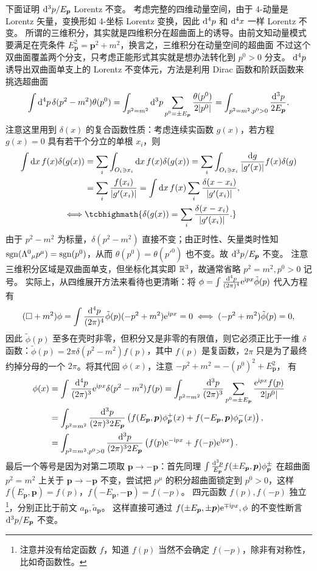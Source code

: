 下面证明 ${\dd[3]p}/{E_{\bm p}}$ Lorentz 不变。
考虑完整的四维动量空间，由于 4-动量是 Lorentz 矢量，变换形如 4-坐标 Lorentz 变换，因此 $\dd[4]{p}$ 和 $\dd[4]x$ 一样 Lorentz 不变。
所谓的三维积分，其实就是四维积分在超曲面上的诱导。由前文知动量模式要满足在壳条件 $E_{\bm p}^2=\bm p^2+m^2$，换言之，三维积分在动量空间的超曲面
不过这个双曲面覆盖两个分支，只考虑正能形式其实就是想办法转化到 $p^0>0$ 分支。
$\dd[4]{p}$ 诱导出双曲面单支上的 Lorentz 不变体元，方法是利用 Dirac 函数和阶跃函数来挑选超曲面
\[
    \int\dd[4]{p}\delta(p^2-m^2)\theta(p^0)= \int_{p^2=m^2}\dd[3]{p} \sum_{p^0=\pm E_{\bm p}}\frac{\theta(p^0)}{2| p^0|}=\int_{p^2=m^2,p^0>0}\frac{\dd[3]p}{2E_{\bm p}}.
\]
注意这里用到 $\delta(x)$ 的复合函数性质：考虑连续实函数 $g(x)$，若方程 $g(x) = 0$ 具有若干个分立的单根 $x_i$，则
\begin{align*}
    \int\d{x}f(x)\delta(g(x))&=\sum_i\int_{O_i\ni x_i}\d{x}f(x)\delta(g(x))=\sum_i\int_{O_i\ni x_i}\frac{\d{g}}{|g'(x)|}f(x)\delta(g)\\
    &=\sum_i\frac{f(x_i)}{|g'(x_i)|} = \int\d{x} f(x)\sum_i\frac{\delta(x-x_i)}{|g'(x_i)|},\\
    \iff& \tcbhighmath{\delta(g(x))=\sum_i \frac{\delta(x-x_i)}{|g'(x_i)|}.}
\end{align*}
由于 $p^2-m^2$ 为标量，$\delta(p^2-m^2)$ 直接不变；由正时性、矢量类时性知 $\operatorname{sgn}(\Lambda^0{}_\mu p^\mu)=\operatorname{sgn}(p^0)$，从而 $\theta(p^0)=\theta(p'^0)$ 也不变。故 ${\dd[3]p}/{E_{\bm p}}$ 不变。
注意三维积分区域是双曲面单支，但坐标化其实即 $\mathbb{R}^3$，故通常省略 $p^2=m^2,p^0>0$ 记号。
实际上，从四维展开方法来看待也更清晰：将 $\phi=\int\frac{\dd[4]{p}}{(2\pi)^4}\mathrm{e}^{\mathrm{i} px}\tilde\phi(p)$ 代入方程有
\[(\square + m^2)\phi = \int\frac{\dd[4]{p}}{(2\pi)^4}\tilde\phi(p)(-p^2 + m^2)\mathrm{e}^{\mathrm{i} px}=0\iff (-p^2+m^2)\tilde\phi(p)=0,\]
因此 $\tilde{\phi}(p)$ 至多在壳时非零，但积分又是非零的有限值，则它必须正比于一维 $\delta$ 函数：$\tilde{\phi}(p) = 2\pi \delta(p^2 - m^2) f(p)$，其中 $f(p)$ 是复函数，$2\pi$ 只是为了最终约掉分母的一个 $2\pi$。将其代回 $\phi(x)$，注意 $-p^2+m^2=-(p^0)^2 + E_{\bm p}^2$，
有
\begin{align*}
    \phi(x)&=\int\frac{\dd[4]{p}}{(2\pi)^3}\mathrm{e}^{\mathrm{i} px} \delta(p^2 - m^2) f(p)= \int_{p^2=m^2}\frac{\dd[3]p}{(2\pi)^3}\sum_{p^0=\pm E_{\bm p}}\frac{\mathrm{e}^{\mathrm{i} px}f(p)}{2|p^0|} \\
    &=\int_{p^2=m^2}\frac{\dd[3]p}{(2\pi)^32E_{\bm p}}\left(f(E_{\bm p},\bm p)\phi^+_{\bm p}(x)+f(-E_{\bm p},\bm p)\phi^-_{\bm p}(x)\right),\\
    &=\int_{p^2=m^2,p^0>0}\frac{\dd[3]p}{(2\pi)^3 2E_{\bm p}}\left(f(p)\mathrm{e}^{-\mathrm{i} px}+f(-p)\mathrm{e}^{\mathrm{i} px}\right).
\end{align*}
最后一个等号是因为对第二项取 $\bm p\to-\bm p$：首先同理 $\int \frac{\dd[3]p}{E_{\bm p}}f(\pm E_{\bm p},\bm p)\phi^\pm_{\bm p}$ 在超曲面 $p^2=m^2$ 上关于 $\bm p\to-\bm p$ 不变，尝试把 $p^\mu$ 的积分超曲面锁定到 $p^0>0$，这样 $f(E_{\bm p},\bm p)=f(p)$，$f(-E_{\bm p},-\bm p)=f(-p)$。
四元函数 $f(p),f(-p)$ 独立\footnote{注意并没有给定函数 $f$，知道 $f(p)$ 当然不会确定 $f(-p)$，除非有对称性，比如奇函数性。}，分别正比于前文 $a_{\bm p},\tilde a_{\bm p}$。
这样直接可通过 $f(\pm E_{\bm p},\pm\bm p)\mathrm{e}^{\mp\mathrm{i} px},\phi$ 的不变性断言 ${\dd[3]p}/{E_{\bm p}}$ 不变。

